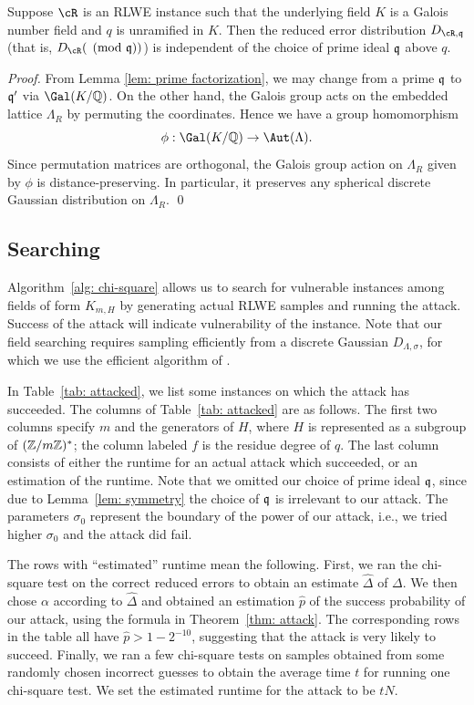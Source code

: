 \documentclass[envcountsect]{llncs}
\begin{document}
\begin{lemma} \label{lem: symmetry}
Suppose $\cR$ is an RLWE instance such that the underlying field $K$ is a Galois number field and $q$ is unramified in $K$. Then the reduced error distribution $D_{\cR,\fq}$ (that is, $D_{\cR} (\pmod{\fq})$) is independent of the choice of prime ideal $\mathfrak{q}$ above $q$.
\end{lemma}

\begin{proof}
        From Lemma \ref{lem: prime factorization}, we may change from a prime $\mathfrak{q}$ to $\mathfrak{q}'$ via $\Gal(K/\bQ)$. On the other hand, the Galois group acts on the embedded lattice $\Lambda_R$ by permuting the coordinates. Hence we have a group homomorphism $$\phi: \Gal(K/\bQ) \to \Aut(\Lambda).$$ Since permutation matrices are orthogonal, the Galois group action on $\Lambda_R$ given by $\phi$ is distance-preserving. In particular, it preserves any spherical discrete Gaussian distribution on $\Lambda_R$. 
\qed \end{proof}

\subsection{Searching}

Algorithm~\ref{alg: chi-square} allows us to search for vulnerable instances among fields of form $K_{m,H}$ by generating actual RLWE samples and running the attack. Success of the attack will indicate vulnerability of the instance. Note that our field searching requires sampling efficiently from a discrete Gaussian $D_{\Lambda, \sigma}$, for which we use the efficient algorithm of \cite{gentry2008trapdoors}. 


In Table~\ref{tab: attacked}, we list some instances on which the attack has succeeded. The columns of Table~\ref{tab: attacked} are as follows. The first two columns specify $m$ and the generators of $H$, where $H$ is represented as 
a subgroup of $(\mathbb{Z}/m\mathbb{Z})^*$; the column labeled $f$ is the residue degree of $q$. The last column consists of either the runtime for an actual attack which succeeded, or an estimation of the runtime. Note that we omitted our choice of prime ideal $\mathfrak{q}$, since due to Lemma~\ref{lem: symmetry} the choice of $\mathfrak{q}$ is irrelevant to our attack. The parameters $\sigma_0$ represent the boundary of the power of our attack, i.e., we tried higher $\sigma_0$ and the attack did fail.

The rows with ``estimated'' runtime mean the following. First, we ran the chi-square test on the correct reduced errors to obtain an estimate $\hat{\Delta}$ of $\Delta$. We then chose $\alpha$ according to $\hat{\Delta}$ and obtained an estimation $\hat{p}$ of the success probability of our attack, using the formula in Theorem~\ref{thm: attack}.  The corresponding rows in the table all have $\hat{p} > 1 - 2^{-10}$, suggesting that the attack is very likely to succeed.  Finally, we ran a few chi-square tests on samples obtained from some randomly chosen incorrect guesses to obtain the average time $t$ for running one chi-square test. We set the estimated runtime for the attack to be $tN$. 
\end{document}
